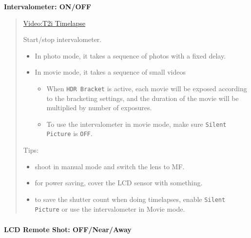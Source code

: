\documentclass[a4paper,english]{article}
\begin{document}
\textbf{Intervalometer: ON/OFF}
%
\begin{quote}

\href{http://magiclantern.wikia.com/wiki/Video\%3AT2i\%20Timelapse}{Video:T2i Timelapse}

Start/stop intervalometer.
%
\begin{itemize}

\item In photo mode, it takes a sequence of photos with a fixed delay.

\item In movie mode, it takes a sequence of small videos
%
\begin{itemize}

\item When \texttt{HDR Bracket} is active, each movie will be exposed according to the bracketing settings, and the duration of the movie will be multiplied by number of exposures.

\item To use the intervalometer in movie mode, make sure \texttt{Silent Picture} is \texttt{OFF}.

\end{itemize}

\end{itemize}

Tips:
%
\begin{itemize}

\item shoot in manual mode and switch the lens to MF.

\item for power saving, cover the LCD sensor with something.

\item to save the shutter count when doing timelapses, enable \texttt{Silent Picture} or use the intervalometer in Movie mode.

\end{itemize}

\end{quote}
\vspace{-10mm}\subsubsection*{}\label{lcd-face-sensor}
\textbf{LCD Remote Shot: OFF/Near/Away}
%
\end{document}
